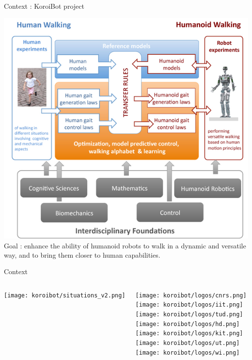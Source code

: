
\begin{frame}{Context : KoroiBot project}
\vspace*{-0.5cm}
\begin{center}
  \includegraphics[height=0.7\textheight , keepaspectratio]
  {figures/koroibot/components.png}\\
Goal : enhance the ability of humanoid robots to walk in a dynamic and versatile way, and to bring them closer to human capabilities.
\end{center}
\end{frame}

\begin{frame}{Context}
\vspace*{-0.7cm}
\begin{columns}
\begin{center}
  \texttt{[image: koroibot/situations\_v2.png]}
\end{center}
\begin{center}
  \texttt{[image: koroibot/logos/cnrs.png]}\\
  \texttt{[image: koroibot/logos/iit.png]}\\
  \texttt{[image: koroibot/logos/tud.png]}\\
  \texttt{[image: koroibot/logos/hd.png]}\\
  \texttt{[image: koroibot/logos/kit.png]}\\
  \texttt{[image: koroibot/logos/ut.png]}\\
  \texttt{[image: koroibot/logos/wi.png]}
\end{center}

\end{columns}
\end{frame}


